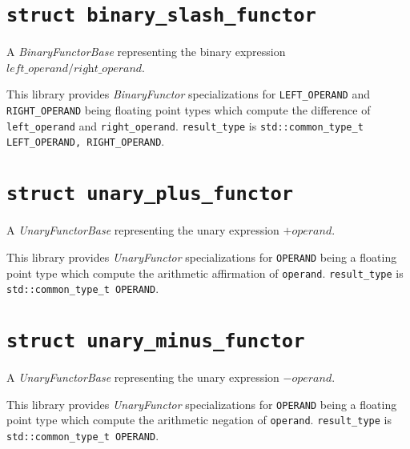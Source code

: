 \documentclass[oneside]{book}
\begin{document}
\section{\texttt{struct binary\_slash\_functor}}
A \textit{BinaryFunctorBase} representing the binary expression $\textit{left\_operand} / \textit{right\_operand}$.\newline

\noindent{}This library provides \textit{BinaryFunctor}         specializations for
\texttt{LEFT\_OPERAND} and   \texttt{RIGHT\_OPERAND} being     floating point types
which compute the difference of \texttt{left\_operand} and \texttt{right\_operand}.
\texttt{result\_type} is \texttt{std::common\_type\_t  \textlangle   LEFT\_OPERAND,
RIGHT\_OPERAND\textrangle}.

\section{\texttt{struct unary\_plus\_functor}}
A \textit{UnaryFunctorBase} representing the unary expression $+\textit{operand}$.\newline

\noindent{}This library provides \textit{UnaryFunctor}            specializations for
\texttt{OPERAND} being a floating point type which compute the arithmetic affirmation
of \texttt{operand}. \texttt{result\_type} is \texttt{std::common\_type\_t\textlangle
OPERAND\textrangle}.

\section{\texttt{struct unary\_minus\_functor}}
A \textit{UnaryFunctorBase} representing the unary expression $-\textit{operand}$.\newline

\noindent{}This library provides \textit{UnaryFunctor}            specializations for
\texttt{OPERAND} being a floating point type which compute the arithmetic    negation
of \texttt{operand}. \texttt{result\_type} is \texttt{std::common\_type\_t\textlangle
OPERAND\textrangle}.

\end{document}
